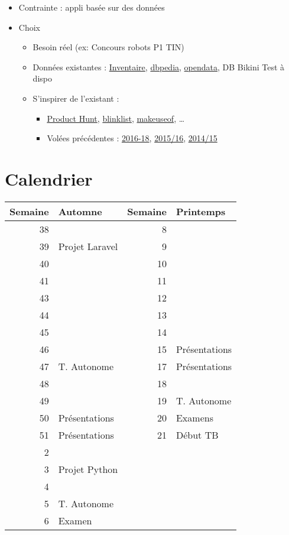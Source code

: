 \begin{itemize}
\tightlist
\item
  Contrainte : appli basée sur des données
\item
  Choix

  \begin{itemize}
  \tightlist
  \item
    Besoin réel (ex: Concours robots P1 TIN)
  \item
    Données existantes :
    \href{https://inventory.ing.he-arc.ch/}{Inventaire},
    \href{http://wiki.dbpedia.org/}{dbpedia},
    \href{https://opendata.swiss/fr/}{opendata}, DB Bikini Test à dispo
  \item
    S'inspirer de l'existant :

    \begin{itemize}
    \tightlist
    \item
      \href{https://www.producthunt.com/topics/web-app}{Product Hunt},
      \href{http://blinklist.com/reviews}{blinklist},
      \href{http://www.makeuseof.com/tag/best-websites-internet/}{makeuseof},
      \ldots{}
    \item
      Volées précédentes : \href{https://he-arc.github.io/}{2016-18},
      \href{https://projets-labinfo.he-arc.ch/projects/webdev/wiki/Wiki\#Projets-2015-2016}{2015/16},
      \href{https://forge.ing.he-arc.ch/projects/1415-dw/wiki/Wiki}{2014/15}
    \end{itemize}
  \end{itemize}
\end{itemize}

\hypertarget{calendrier}{%
\section{Calendrier}\label{calendrier}}

\begin{longtable}[]{@{}rlrl@{}}
\toprule
Semaine & Automne & Semaine & Printemps\tabularnewline
\midrule
\endhead
38 & & 8 &\tabularnewline
39 & Projet Laravel & 9 &\tabularnewline
40 & & 10 &\tabularnewline
41 & & 11 &\tabularnewline
43 & & 12 &\tabularnewline
44 & & 13 &\tabularnewline
45 & & 14 &\tabularnewline
46 & & 15 & Présentations\tabularnewline
47 & T. Autonome & 17 & Présentations\tabularnewline
48 & & 18 &\tabularnewline
49 & & 19 & T. Autonome\tabularnewline
50 & Présentations & 20 & Examens\tabularnewline
51 & Présentations & 21 & Début TB\tabularnewline
2 & & &\tabularnewline
3 & Projet Python & &\tabularnewline
4 & & &\tabularnewline
5 & T. Autonome & &\tabularnewline
6 & Examen & &\tabularnewline
\bottomrule
\end{longtable}

